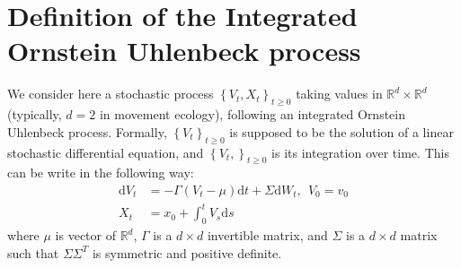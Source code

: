 \documentclass[]{book}
\newcommand{\rmd}{\text{d}}
\begin{document}
\hypertarget{definition-of-the-integrated-ornstein-uhlenbeck-process}{%
\section{Definition of the Integrated Ornstein Uhlenbeck process}\label{definition-of-the-integrated-ornstein-uhlenbeck-process}}

We consider here a stochastic process \(\left\lbrace V_t, X_t \right\rbrace_{t \geq 0}\) taking values in \(\mathbb{R}^{d}\times \mathbb{R}^{d}\) (typically, \(d = 2\) in movement ecology), following an integrated Ornstein Uhlenbeck process.
Formally, \(\left\lbrace V_t \right\rbrace_{t \geq 0}\) is supposed to be the solution of a linear stochastic differential equation, and \(\left\lbrace V_t, \right\rbrace_{t \geq 0}\) is its integration over time.
This can be write in the following way:
\begin{equation}
\begin{array}{rl}
\rmd V_t &= -\Gamma \left( V_t - \mu \right)\rmd t + \Sigma \rmd W_t,~~V_0 = v_0\\
X_t &= x_0 + \int_0^t V_s \rmd s
\end{array}
\label{eq:IOU-SDE}
\end{equation}
where \(\mu\) is vector of \(\mathbb{R}^d\), \(\Gamma\) is a \(d \times d\) invertible matrix, and \(\Sigma\) is a \(d \times d\) matrix such that \(\Sigma\Sigma^T\) is symmetric and positive definite.
\end{document}
